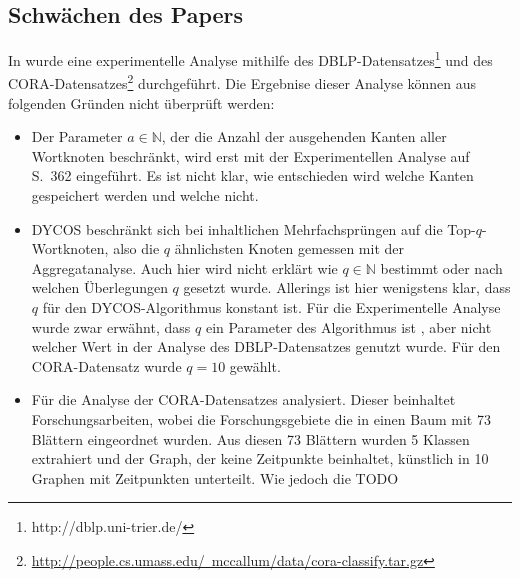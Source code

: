 \subsection{Schwächen des Papers}
In \cite{aggarwal2011} wurde eine experimentelle Analyse mithilfe 
des DBLP-Datensatzes\footnote{http://dblp.uni-trier.de/} und des
CORA-Datensatzes\footnote{\href{http://people.cs.umass.edu/~mccallum/data/cora-classify.tar.gz}{http://people.cs.umass.edu/~mccallum/data/cora-classify.tar.gz}} durchgeführt.
Die Ergebnise dieser Analyse können aus folgenden Gründen
nicht überprüft werden:
\begin{itemize}
    \item Der Parameter $a \in \mathbb{N}$, der die Anzahl der ausgehenden Kanten
          aller Wortknoten beschränkt, wird erst mit der Experimentellen
          Analyse auf S.~362 eingeführt.
          Es ist nicht klar, wie entschieden wird welche Kanten
          gespeichert werden und welche nicht.
    \item DYCOS beschränkt sich bei inhaltlichen Mehrfachsprüngen
          auf die Top-$q$-Wortknoten, also die $q$ ähnlichsten Knoten
          gemessen mit der Aggregatanalyse. Auch hier wird nicht erklärt wie
          $q \in \mathbb{N}$ bestimmt oder nach welchen Überlegungen $q$ gesetzt 
          wurde. Allerings ist hier wenigstens klar, dass $q$ für
          den DYCOS-Algorithmus konstant ist. Für die Experimentelle
          Analyse wurde zwar erwähnt, dass $q$ ein Parameter des
          Algorithmus ist \cite[S. 362]{aggarwal2011}, aber nicht welcher
          Wert in der Analyse des DBLP-Datensatzes genutzt wurde.
          Für den CORA-Datensatz wurde $q=10$ gewählt\cite[S. 364]{aggarwal2011}.
    \item Für die Analyse der CORA-Datensatzes analysiert.
          Dieser beinhaltet Forschungsarbeiten, wobei die 
          Forschungsgebiete die in einen Baum mit 73 Blättern 
          eingeordnet wurden. Aus diesen 73 Blättern wurden 5 Klassen
          extrahiert und der Graph, der keine Zeitpunkte beinhaltet,
          künstlich in 10 Graphen mit Zeitpunkten unterteilt. Wie
          jedoch die TODO
\end{itemize}
